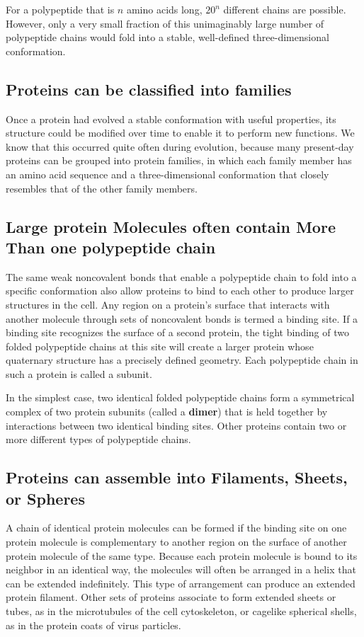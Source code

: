 For a polypeptide that is $n$ amino acids long, $20^n$ different chains are possible.
However, only a very small fraction of this unimaginably large number
of polypeptide chains would fold into a stable, well-defined three-dimensional conformation.

\subsection{Proteins can be classified into families}

Once a protein had evolved a stable conformation with useful properties,
its structure could be modified over time to enable it to perform
new functions. We know that this occurred quite often during evolution,
because many present-day proteins can be grouped into protein families,
in which each family member has an amino acid sequence and a
three-dimensional conformation that closely resembles that of the other
family members.

\subsection{Large protein Molecules often contain More Than one polypeptide chain}

The same weak noncovalent bonds that enable a polypeptide chain to
fold into a specific conformation also allow proteins to bind to each other
to produce larger structures in the cell. Any region on a protein’s surface
that interacts with another molecule through sets of noncovalent bonds
is termed a binding site.
If a binding site recognizes the surface
of a second protein, the tight binding of two folded polypeptide chains
at this site will create a larger protein whose quaternary structure has a
precisely defined geometry. Each polypeptide chain in such a protein is
called a subunit.

In the simplest case, two identical folded polypeptide chains form a symmetrical
complex of two protein subunits (called a \textbf{dimer}) that is held
together by interactions between two identical binding sites.
Other proteins contain two or more different types of polypeptide chains.

\subsection{Proteins can assemble into Filaments, Sheets, or Spheres}

A chain of identical protein molecules can be formed if the
binding site on one protein molecule is complementary to another region
on the surface of another protein molecule of the same type. Because
each protein molecule is bound to its neighbor in an identical way, the
molecules will often be arranged in a helix that can be extended indefinitely.
This type of arrangement can produce an extended protein filament.
Other sets of proteins associate to form extended sheets or tubes,
as in the microtubules of the cell cytoskeleton, or cagelike spherical shells,
as in the protein coats of virus particles.

